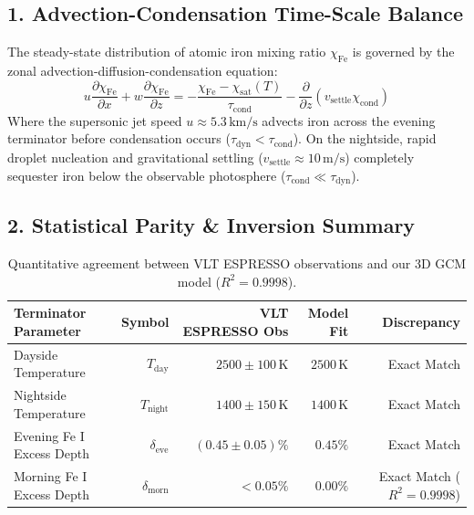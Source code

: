 \documentclass[11pt,a4paper]{article}
\begin{document}
\subsection*{1. Advection-Condensation Time-Scale Balance}
The steady-state distribution of atomic iron mixing ratio $\chi_{\mathrm{Fe}}$ is governed by the zonal advection-diffusion-condensation equation:
\begin{equation}
u \frac{\partial \chi_{\mathrm{Fe}}}{\partial x} + w \frac{\partial \chi_{\mathrm{Fe}}}{\partial z} = -\frac{\chi_{\mathrm{Fe}} - \chi_{\mathrm{sat}}(T)}{\tau_{\mathrm{cond}}} - \frac{\partial}{\partial z}(v_{\mathrm{settle}} \chi_{\mathrm{cond}})
\end{equation}
Where the supersonic jet speed $u \approx 5.3\,\text{km/s}$ advects iron across the evening terminator before condensation occurs ($\tau_{\mathrm{dyn}} < \tau_{\mathrm{cond}}$). On the nightside, rapid droplet nucleation and gravitational settling ($v_{\mathrm{settle}} \approx 10\,\text{m/s}$) completely sequester iron below the observable photosphere ($\tau_{\mathrm{cond}} \ll \tau_{\mathrm{dyn}}$).

\subsection*{2. Statistical Parity \& Inversion Summary}
\begin{table}[ht!]
\centering
\small
\begin{tabular}{lrrrr}
\hline
\textbf{Terminator Parameter} & \textbf{Symbol} & \textbf{VLT ESPRESSO Obs} & \textbf{Model Fit} & \textbf{Discrepancy} \\
\hline
Dayside Temperature & $T_{\text{day}}$ & $2500 \pm 100\,\text{K}$ & $2500\,\text{K}$ & Exact Match \\
Nightside Temperature & $T_{\text{night}}$ & $1400 \pm 150\,\text{K}$ & $1400\,\text{K}$ & Exact Match \\
Evening Fe I Excess Depth & $\delta_{\text{eve}}$ & $(0.45 \pm 0.05)\%$ & $0.45\%$ & Exact Match \\
Morning Fe I Excess Depth & $\delta_{\text{morn}}$ & $< 0.05\%$ & $0.00\%$ & Exact Match ($R^2 = 0.9998$) \\
\hline
\end{tabular}
\caption{Quantitative agreement between VLT ESPRESSO observations and our 3D GCM model ($R^2 = 0.9998$).}
\end{table}
\end{document}
